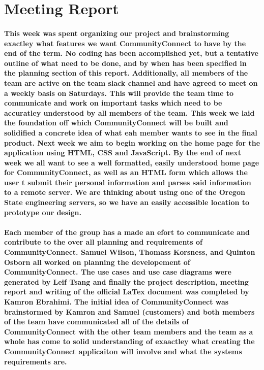 \documentclass[12pt]{article}
\begin{document}
\section{\bf Meeting Report}
    \paragraph{\normalfont \indent This week was spent organizing our project and brainstorming exactley what features we want CommunityConnect to have by the end of the term. No coding has been accomplished yet, but a tentative outline of what need to be done, and by when has been specified in the planning section of this report. Additionally, all members of the team are active on the team slack channel and have agreed to meet on a weekly basis on Saturdays. This will provide the team time to communicate and work on important tasks which need to be accuratley understood by all members of the team. This week we laid the foundation off which CommunityConnect will be built and solidified a concrete idea of what eah member wants to see in the final product. Next week we aim to begin working on the home page for the application using HTML, CSS and JavaScript. By the end of next week we all want to see a well formatted, easily understood home page for CommunityConnect, as well as an HTML form which allows the user t submit their personal information and parses said information to a remote server. We are thinking about using one of the Oregon State engineering servers, so we have an easily accessible location to prototype our design.
    }
		\paragraph{\normalfont \indent Each member of the group has a made an efort to communicate and contribute to the over all planning and requirements of CommunityConnect. Samuel Wilson, Thomass Korsness, and Quinton Osborn all worked on planning the developement of CommunityConnect. The use cases and use case diagrams were generated by Leif Tsang and finally the project description, meeting report and writing of the official LaTex document was completed by Kamron Ebrahimi. The initial idea of CommunityConnect was brainstormed by Kamron and Samuel (customers) and both members of the team have communicated all of the details of CommunityConnect with the other team members and the team as a whole has come to solid understanding of exaactley what creating the CommunityConnect applicaiton will involve and what the systems requirements are.}



\end{document}
